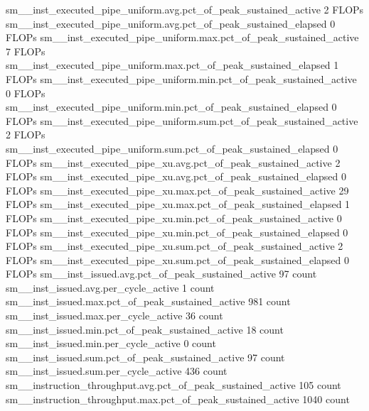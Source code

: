 sm__inst_executed_pipe_uniform.avg.pct_of_peak_sustained_active                                2 FLOPs
sm__inst_executed_pipe_uniform.avg.pct_of_peak_sustained_elapsed                               0 FLOPs
sm__inst_executed_pipe_uniform.max.pct_of_peak_sustained_active                                7 FLOPs
sm__inst_executed_pipe_uniform.max.pct_of_peak_sustained_elapsed                               1 FLOPs
sm__inst_executed_pipe_uniform.min.pct_of_peak_sustained_active                                0 FLOPs
sm__inst_executed_pipe_uniform.min.pct_of_peak_sustained_elapsed                               0 FLOPs
sm__inst_executed_pipe_uniform.sum.pct_of_peak_sustained_active                                2 FLOPs
sm__inst_executed_pipe_uniform.sum.pct_of_peak_sustained_elapsed                               0 FLOPs
sm__inst_executed_pipe_xu.avg.pct_of_peak_sustained_active                                     2 FLOPs
sm__inst_executed_pipe_xu.avg.pct_of_peak_sustained_elapsed                                    0 FLOPs
sm__inst_executed_pipe_xu.max.pct_of_peak_sustained_active                                    29 FLOPs
sm__inst_executed_pipe_xu.max.pct_of_peak_sustained_elapsed                                    1 FLOPs
sm__inst_executed_pipe_xu.min.pct_of_peak_sustained_active                                     0 FLOPs
sm__inst_executed_pipe_xu.min.pct_of_peak_sustained_elapsed                                    0 FLOPs
sm__inst_executed_pipe_xu.sum.pct_of_peak_sustained_active                                     2 FLOPs
sm__inst_executed_pipe_xu.sum.pct_of_peak_sustained_elapsed                                    0 FLOPs
sm__inst_issued.avg.pct_of_peak_sustained_active                                              97 count
sm__inst_issued.avg.per_cycle_active                                                           1 count
sm__inst_issued.max.pct_of_peak_sustained_active                                             981 count
sm__inst_issued.max.per_cycle_active                                                          36 count
sm__inst_issued.min.pct_of_peak_sustained_active                                              18 count
sm__inst_issued.min.per_cycle_active                                                           0 count
sm__inst_issued.sum.pct_of_peak_sustained_active                                              97 count
sm__inst_issued.sum.per_cycle_active                                                         436 count
sm__instruction_throughput.avg.pct_of_peak_sustained_active                                  105 count
sm__instruction_throughput.max.pct_of_peak_sustained_active                                 1040 count
